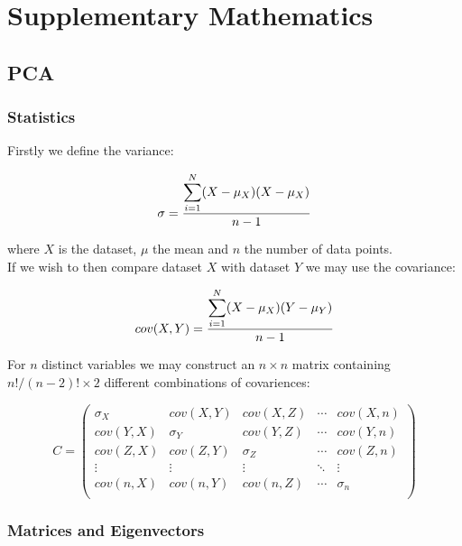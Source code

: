 

   \chapter{Supplementary Mathematics}

  \section{PCA} \label{apendix:pca}
  \subsection{Statistics}

  Firstly we define the variance:

  \begin{equation}
      \sigma = \frac{ \mathlarger{\sum}_{i=1}^{N} (X-\mu_X)(X-\mu_X)}{n-1}
  \end{equation}

  where $X$ is the dataset, $\mu$ the mean and $n$ the number of data points.\\

  If we wish to then compare dataset $X$ with dataset $Y$ we may use the covariance:

  \begin{equation}
      cov(X,Y) = \frac{ \mathlarger{\sum}_{i=1}^{N} (X-\mu_X)(Y-\mu_Y)}{n-1}
  \end{equation}

  For $n$ distinct variables we may construct an $n \times n$ matrix containing $n!/(n-2)!\times 2$ different combinations of covariences:



  \[
  C=
    \begin{pmatrix}
      \sigma_X & cov(X,Y) & cov(X,Z)& \cdots & cov(X,n) \\
      cov(Y,X) & \sigma_Y & cov(Y,Z)& \cdots & cov(Y,n) \\
      cov(Z,X)& cov(Z,Y) & \sigma_Z& \cdots & cov(Z,n) \\
      \vdots & \vdots & \vdots & \ddots & \vdots \\
      cov(n,X) & cov(n,Y) & cov(n,Z)& \cdots & \sigma_n \\
    \end{pmatrix}
  \]

  \subsection{Matrices and Eigenvectors}

